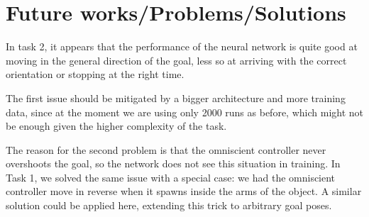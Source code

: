 \section{Future works/Problems/Solutions}
In task 2, it appears that the performance of the neural network is quite good 
at moving in the general direction of the goal, less so at arriving with the 
correct orientation or stopping at the right time.

The first issue should be mitigated by a bigger architecture and more training 
data, since at the moment we are using only 2000 runs as before, which might 
not be enough given the higher complexity of the task.

The reason for the second problem is that the omniscient controller never 
overshoots the goal, so the network does not see this situation in training.
In Task 1, we solved the same issue with a special case: we had the omniscient 
controller move in reverse when it spawns inside the arms of the object. A 
similar solution could be applied here, extending this trick to arbitrary goal 
poses.


